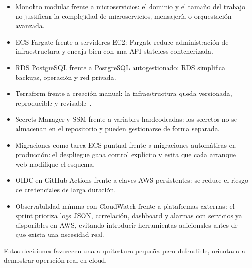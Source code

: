 \begin{itemize}
  \item Monolito modular frente a microservicios: el dominio y el tamaño del trabajo no justifican la complejidad de microservicios, mensajería o orquestación avanzada.
  \item ECS Fargate frente a servidores EC2: Fargate reduce administración de infraestructura y encaja bien con una API stateless contenerizada.
  \item RDS PostgreSQL frente a PostgreSQL autogestionado: RDS simplifica backups, operación y red privada.
  \item Terraform frente a creación manual: la infraestructura queda versionada, reproducible y revisable~\cite{TerraformDocs}.
  \item Secrets Manager y SSM frente a variables hardcodeadas: los secretos no se almacenan en el repositorio y pueden gestionarse de forma separada.
  \item Migraciones como tarea ECS puntual frente a migraciones automáticas en producción: el despliegue gana control explícito y evita que cada arranque web modifique el esquema.
  \item OIDC en GitHub Actions frente a claves AWS persistentes: se reduce el riesgo de credenciales de larga duración.
  \item Observabilidad mínima con CloudWatch frente a plataformas externas: el sprint prioriza logs JSON, correlación, dashboard y alarmas con servicios ya disponibles en AWS, evitando introducir herramientas adicionales antes de que exista una necesidad real.
\end{itemize}

Estas decisiones favorecen una arquitectura pequeña pero defendible, orientada a demostrar operación real en cloud.
